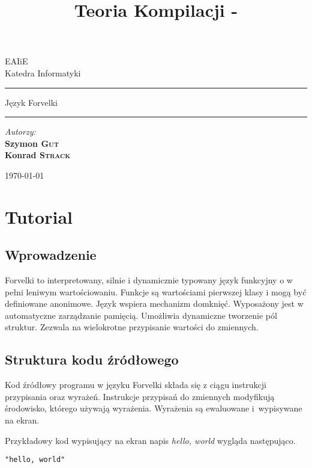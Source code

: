 \documentclass[4paper,10pt]{article}
\title{Teoria Kompilacji - \labtitle}
\author{\labauthors}
\def \labtitle {Język Forvelki}
\begin{document}
  \begin{titlepage}
    \begin{center}
      \vskip 1cm
      EAIiE \\ Katedra Informatyki \vskip 3cm

      \hrule \medskip
      \huge \labtitle
 \\ \smallskip
      \normalsize
      \smallskip \hrule


    \end{center}

      \vskip 10cm
      \normalsize
      \noindent \emph{Autorzy:}\smallskip\\
		\textbf{Szymon \textsc{Gut}}\\
		\textbf{Konrad \textsc{Strack}}

    \begin{center}
      \vfill
      \today
    \end{center}

  \end{titlepage}

\setcounter{section}{0}

\section{Tutorial}

\subsection{Wprowadzenie}
Forvelki to interpretowany, silnie i dynamicznie typowany język funkcyjny o w pełni leniwym wartościowaniu.
Funkcje są wartościami pierwszej klasy i mogą być definiowane anonimowe.
Język wspiera mechanizm domknięć.
Wyposażony jest w automatyczne zarządzanie pamięcią.
Umożliwia dynamiczne tworzenie pól struktur.
Zezwala na wielokrotne przypisanie wartości do zmiennych.

\subsection{Struktura kodu źródłowego}
Kod źródłowy programu w języku Forvelki składa się z ciągu instrukcji przypisania oraz wyrażeń.
Instrukcje przypisań do zmiennych modyfikują środowisko, którego używają wyrażenia.
Wyrażenia są ewaluowane i~wypisywane na ekran.

Przykładowy kod wypisujący na ekran napis \emph{hello, world} wygląda następująco.
\begin{lstlisting}
"hello, world"
\end{lstlisting}
\end{document}
